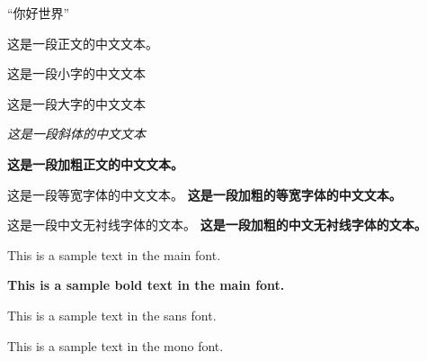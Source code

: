 \documentclass[10pt, a4paper]{ctexbook}
\begin{document}
``你好世界''

这是一段正文的中文文本。

{\small 这是一段小字的中文文本}

{\Large 这是一段大字的中文文本}

{\itshape 这是一段斜体的中文文本}

\textbf{这是一段加粗正文的中文文本。}

{
这是一段等宽字体的中文文本。
\textbf{这是一段加粗的等宽字体的中文文本。}
}

{
这是一段中文无衬线字体的文本。
\textbf{这是一段加粗的中文无衬线字体的文本。}
}

This is a sample text in the main font.

\textbf{This is a sample bold text in the main font.}

{\sffamily This is a sample text in the sans font.}

{\ttfamily This is a sample text in the mono font.}
% 
\end{document}
